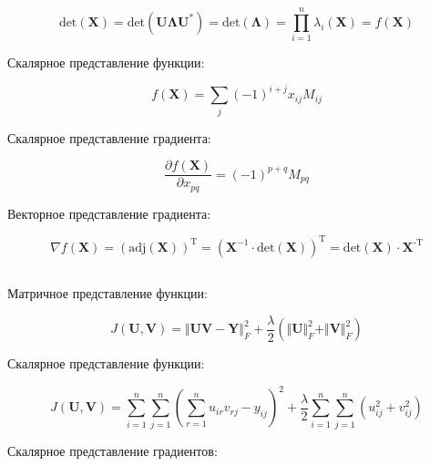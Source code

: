 	\begin{equation}
	\text{det} (\mathbf{X}) = \text{det}(\mathbf{U} \mathbf{\Lambda} \mathbf{U^*}) = \text{det}(\mathbf{\Lambda} ) = \prod\limits_{i=1}^n \lambda_i  (\mathbf{X}) = f(\mathbf{X})
	\end{equation}
	
	Скалярное представление функции:
	
	\begin{equation}
	f(\mathbf{X}) = \sum_j (-1)^{i+j} x_{ij} M_{ij}
	\end{equation}
	
	Скалярное представление градиента:
	
	\begin{equation}
	\frac{\partial f(\mathbf{X}) }{\partial x_{pq}} = (-1)^{p+q}  M_{pq}
	\end{equation}
	
	Векторное представление градиента:
	
	\begin{equation}
	\nabla f(\mathbf{X})  = (\text{adj}(\mathbf{X}))^{\text{T}} = (\mathbf{X}^{-1}\cdot \text{det}(\mathbf{X}))^{\text{T}} = \text{det}(\mathbf{X}) \cdot\mathbf{X}^{\text{-T}}
	\end{equation}
	
	\subsection{}
	
	Матричное представление функции:
	
	\begin{equation}
	J(\mathbf{U}, \mathbf{V}) = \Vert \mathbf{U} \mathbf{V} - \mathbf{Y} \Vert_F^2 + \frac{\lambda}{2}(\Vert \mathbf{U} \Vert_F^2 + \Vert \mathbf{V}\Vert_F^2)
	\end{equation}
	
	Скалярное представление функции:
	
	\begin{equation}
	J(\mathbf{U}, \mathbf{V}) = \sum\limits_{i=1}^{n} \sum\limits_{j=1}^{n} (\sum\limits_{r=1}^{n}u_{ir}v_{rj}-y_{ij})^2 + \frac{\lambda}{2}\sum\limits_{i=1}^{n} \sum\limits_{j=1}^{n}(u_{ij}^2+v_{ij}^2)
	\end{equation}
	
	Скалярное представление градиентов:
	
